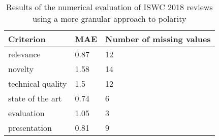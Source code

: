 \begin{table}[!htb]
\caption{Results of the numerical evaluation of ISWC 2018 reviews using a more granular approach to polarity}
\label{tab:eval_numerical_granular}
\centering
\begin{tabular}{l|l|l}
\textbf{Criterion} & \textbf{MAE} & \textbf{Number of missing values} \\ \hline
relevance          & 0.87         & 12                                \\
novelty            & 1.58          & 14                                \\
technical quality  & 1.5         & 12                                \\
state of the art   & 0.74         & 6                                 \\
evaluation         & 1.05          & 3                                 \\
presentation       & 0.81          & 9                                
\end{tabular}
\end{table}